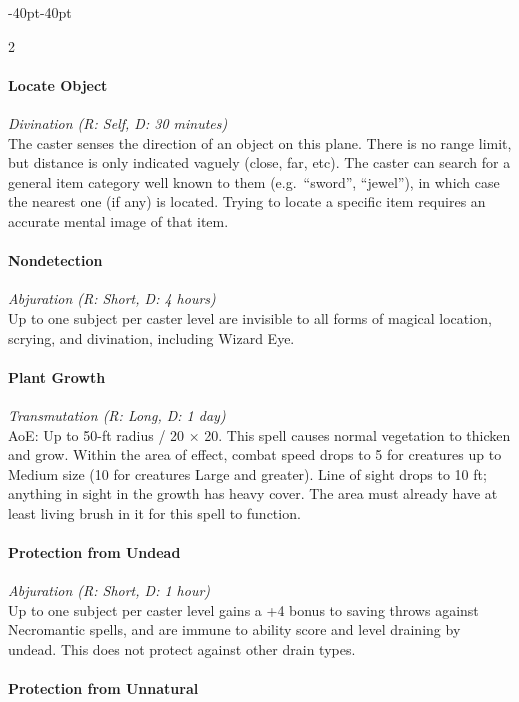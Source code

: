\documentclass{book}
\begin{document}
\begin{adjustwidth}{-40pt}{-40pt}
\begin{multicols}{2}
\paragraph{Locate Object}\label{locate-object}

\emph{Divination (R: Self, D: 30 minutes)}\\
The caster senses the direction of an object on this plane. There is no
range limit, but distance is only indicated vaguely (close, far, etc).
The caster can search for a general item category well known to them
(e.g.~``sword'', ``jewel''), in which case the nearest one (if any) is
located. Trying to locate a specific item requires an accurate mental
image of that item.

\paragraph{Nondetection}\label{nondetection}

\emph{Abjuration (R: Short, D: 4 hours)}\\
Up to one subject per caster level are invisible to all forms of magical
location, scrying, and divination, including Wizard Eye.

\paragraph{Plant Growth}\label{plant-growth}

\emph{Transmutation (R: Long, D: 1 day)}\\
AoE: Up to 50-ft radius / 20 × 20. This spell causes normal vegetation
to thicken and grow. Within the area of effect, combat speed drops to 5
for creatures up to Medium size (10 for creatures Large and greater).
Line of sight drops to 10 ft; anything in sight in the growth has heavy
cover. The area must already have at least living brush in it for this
spell to function.

\paragraph{Protection from Undead}\label{protection-from-undead}

\emph{Abjuration (R: Short, D: 1 hour)}\\
Up to one subject per caster level gains a +4 bonus to saving throws
against Necromantic spells, and are immune to ability score and level
draining by undead. This does not protect against other drain types.

\paragraph{Protection from Unnatural}\label{protection-from-unnatural}


\end{multicols}
\end{adjustwidth}
\end{document}
